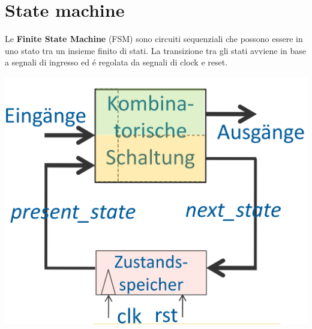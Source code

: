 \section{State machine}
    \begin{minipage}[t]{0.48\columnwidth}
        \vspace{0pt} %
        Le \textbf{Finite State Machine} (FSM) sono circuiti sequenziali che possono essere in uno stato tra un insieme finito di stati. 
        La transizione tra gli stati avviene in base a segnali di ingresso ed é regolata da segnali di clock e reset.
    \end{minipage}
    \hfill
    \begin{minipage}[t]{0.48\columnwidth}
        \vspace{0pt} %
        \includegraphics[width=\linewidth]{Images/FSMGeneralizzata.png}
    \end{minipage}%
    

